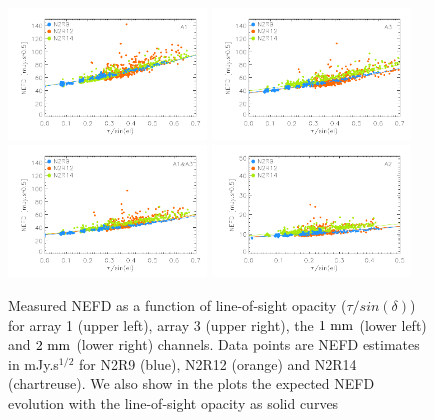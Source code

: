 \begin{figure}[!thbp]
\begin{center}
\includegraphics[clip=true,width=0.47\textwidth]{Figures/NEFD/plot_nefd_vs_obstau_corrected_skydip_vfinal_a1.pdf}
\includegraphics[clip=true,width=0.47\textwidth]{Figures/NEFD/plot_nefd_vs_obstau_corrected_skydip_vfinal_a3.pdf}
\includegraphics[clip=true,width=0.47\textwidth]{Figures/NEFD/plot_nefd_vs_obstau_corrected_skydip_vfinal_1mm.pdf}
\includegraphics[clip=true,width=0.47\textwidth]{Figures/NEFD/plot_nefd_vs_obstau_corrected_skydip_vfinal_a2.pdf}
\caption[Measured NEFD versus observed opacity]{Measured NEFD as a function of
  line-of-sight opacity ($\tau/sin(\delta)$) for array 1 (upper left), array 3 (upper right), the
  $1~\rm{mm}$ (lower left) and $2~\rm{mm}$ (lower right)
  channels. Data points
  are NEFD estimates in mJy.s$^{1/2}$ for N2R9 (blue), N2R12 (orange)
  and N2R14 (chartreuse). We also show in the plots the expected NEFD evolution
  with the line-of-sight opacity as solid curves }
\label{fig:nefdvsbackground_below_1Jy}
\end{center}
\end{figure}
 

